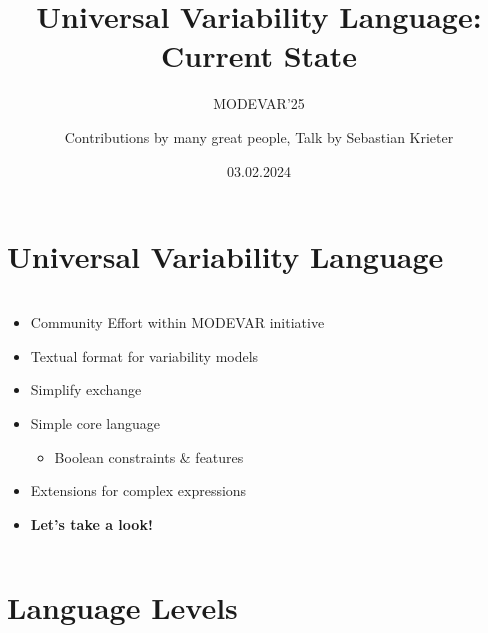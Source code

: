\documentclass[
	aspectratio=169, %
	8pt, %
	nosectionframes, %
]{beamer}
\title[UVL: Current State]{Universal Variability Language: Current State} %
\subtitle[MODEVAR'25]{MODEVAR'25} %
\author[Chico Sundermann]{Contributions by many great people, Talk by Sebastian Krieter} %
\date{03.02.2024} %
\begin{document}

\section{Universal Variability Language}

\begin{frame}
	\frametitle{\insertsection}
	\begin{columns}
		\begin{column}{0.49\textwidth}
			\begin{itemize}
				\item Community Effort within MODEVAR initiative
				\item Textual format for variability models
				\item Simplify exchange
				\item<2-> Simple core language
                \begin{itemize}
                    \item Boolean constraints \& features
                \end{itemize}
                \item<2-> Extensions for complex expressions
                \item<3-> \textbf{Let's take a look!}
			\end{itemize}
		\end{column}

		\begin{column}{0.49\textwidth}
		\end{column}
	\end{columns}
\end{frame}

\section{Language Levels}
\end{document}
